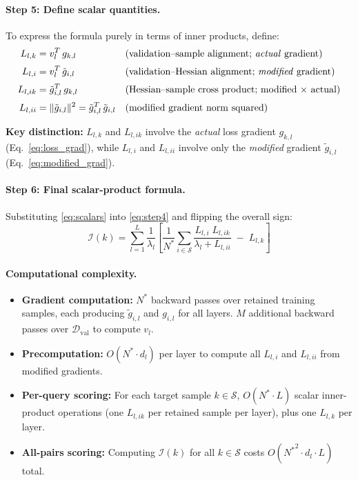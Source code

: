 \documentclass{article}
\begin{document}
\paragraph{Step 5: Define scalar quantities.}
To express the formula purely in terms of inner products, define:
\begin{equation}\label{eq:scalars}
\begin{aligned}
    L_{l,k}  &= v_l^T\,g_{k,l}  &&\text{(validation--sample alignment; \emph{actual} gradient)} \\[2pt]
    L_{l,i}  &= v_l^T\,\tilde{g}_{i,l}  &&\text{(validation--Hessian alignment; \emph{modified} gradient)} \\[2pt]
    L_{l,ik} &= \tilde{g}_{i,l}^T\,g_{k,l} &&\text{(Hessian--sample cross product; modified $\times$ actual)} \\[2pt]
    L_{l,ii} &= \|\tilde{g}_{i,l}\|^2 = \tilde{g}_{i,l}^T\,\tilde{g}_{i,l} &&\text{(modified gradient norm squared)}
\end{aligned}
\end{equation}

\textbf{Key distinction:} $L_{l,k}$ and $L_{l,ik}$ involve the \emph{actual} loss gradient $g_{k,l}$ (Eq.~\eqref{eq:loss_grad}), while $L_{l,i}$ and $L_{l,ii}$ involve only the \emph{modified} gradient $\tilde{g}_{i,l}$ (Eq.~\eqref{eq:modified_grad}).

\paragraph{Step 6: Final scalar-product formula.}
Substituting \eqref{eq:scalars} into \eqref{eq:step4} and flipping the overall sign:
\begin{equation}\label{eq:influence_final}
\boxed{
    \mathcal{I}(k)
    = \sum_{l=1}^{L}\frac{1}{\lambda_l}
    \left[
      \frac{1}{N^*}\sum_{i\in\mathcal{S}}
      \frac{L_{l,i}\;L_{l,ik}}{\lambda_l + L_{l,ii}}
      \;-\; L_{l,k}
    \right]
}
\end{equation}

\paragraph{Computational complexity.}
\begin{itemize}
    \item \textbf{Gradient computation:} $N^*$ backward passes over retained training samples, each producing $\tilde{g}_{i,l}$ and $g_{i,l}$ for all layers. $M$ additional backward passes over $\mathcal{D}_{\mathrm{val}}$ to compute $v_l$.
    \item \textbf{Precomputation:} $O(N^* \cdot d_l)$ per layer to compute all $L_{l,i}$ and $L_{l,ii}$ from modified gradients.
    \item \textbf{Per-query scoring:} For each target sample $k \in \mathcal{S}$, $O(N^* \cdot L)$ scalar inner-product operations (one $L_{l,ik}$ per retained sample per layer), plus one $L_{l,k}$ per layer.
    \item \textbf{All-pairs scoring:} Computing $\mathcal{I}(k)$ for all $k \in \mathcal{S}$ costs $O({N^*}^2 \cdot d_l \cdot L)$ total.
\end{itemize}
\end{document}
